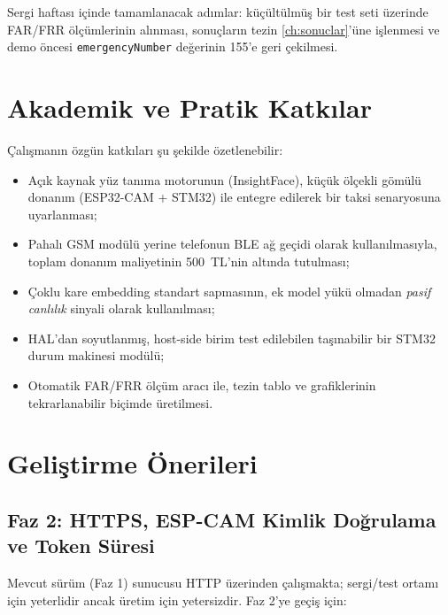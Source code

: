 Sergi haftası içinde tamamlanacak adımlar: küçültülmüş bir test seti
üzerinde FAR/FRR ölçümlerinin alınması, sonuçların tezin
\ref{ch:sonuclar}'üne işlenmesi ve demo öncesi \texttt{emergencyNumber}
değerinin 155'e geri çekilmesi.

\section{Akademik ve Pratik Katkılar}

Çalışmanın özgün katkıları şu şekilde özetlenebilir:

\begin{itemize}
    \item Açık kaynak yüz tanıma motorunun (InsightFace), küçük ölçekli
          gömülü donanım (ESP32-CAM + STM32) ile entegre edilerek bir
          taksi senaryosuna uyarlanması;
    \item Pahalı GSM modülü yerine telefonun BLE ağ geçidi olarak
          kullanılmasıyla, toplam donanım maliyetinin 500~TL'nin altında
          tutulması;
    \item Çoklu kare embedding standart sapmasının, ek model yükü
          olmadan \emph{pasif canlılık} sinyali olarak kullanılması;
    \item HAL'dan soyutlanmış, host-side birim test edilebilen taşınabilir
          bir STM32 durum makinesi modülü;
    \item Otomatik FAR/FRR ölçüm aracı ile, tezin tablo ve grafiklerinin
          tekrarlanabilir biçimde üretilmesi.
\end{itemize}

\section{Geliştirme Önerileri}

\subsection{Faz 2: HTTPS, ESP-CAM Kimlik Doğrulama ve Token Süresi}

Mevcut sürüm (Faz 1) sunucusu HTTP üzerinden çalışmakta; sergi/test
ortamı için yeterlidir ancak üretim için yetersizdir. Faz 2'ye geçiş için:

